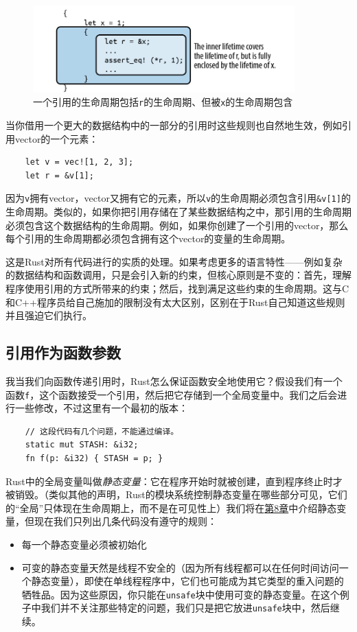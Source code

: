 \begin{figure}[htbp]
    \centering
    \includegraphics[width=0.9\textwidth]{../img/f5-6.png}
    \caption{一个引用的生命周期包括\texttt{r}的生命周期、但被\texttt{x}的生命周期包含}
    \label{f5-6}
\end{figure}

当你借用一个更大的数据结构中的一部分的引用时这些规则也自然地生效，例如引用vector的一个元素：
\begin{verbatim}
    let v = vec![1, 2, 3];
    let r = &v[1];
\end{verbatim}

因为\texttt{v}拥有vector，vector又拥有它的元素，所以\texttt{v}的生命周期必须包含引用\texttt{\&v[1]}的生命周期。类似的，如果你把引用存储在了某些数据结构之中，那引用的生命周期必须包含这个数据结构的生命周期。例如，如果你创建了一个引用的vector，那么每个引用的生命周期都必须包含拥有这个vector的变量的生命周期。

这是Rust对所有代码进行的实质的处理。如果考虑更多的语言特性——例如复杂的数据结构和函数调用，只是会引入新的约束，但核心原则是不变的：首先，理解程序使用引用的方式所带来的约束；然后，找到满足这些约束的生命周期。这与C和C++程序员给自己施加的限制没有太大区别，区别在于Rust自己知道这些规则并且强迫它们执行。

\subsection{引用作为函数参数}\label{RefAsArg}

我当我们向函数传递引用时，Rust怎么保证函数安全地使用它？假设我们有一个函数\texttt{f}，这个函数接受一个引用，然后把它存储到一个全局变量中。我们之后会进行一些修改，不过这里有一个最初的版本：
\begin{verbatim}
    // 这段代码有几个问题，不能通过编译。
    static mut STASH: &i32;
    fn f(p: &i32) { STASH = p; }
\end{verbatim}

Rust中的全局变量叫做\emph{静态变量}：它在程序开始时就被创建，直到程序终止时才被销毁。（类似其他的声明，Rust的模块系统控制静态变量在哪些部分可见，它们的“全局”只体现在生命周期上，而不是在可见性上）我们将在\hyperref[ch08]{第8章}中介绍静态变量，但现在我们只列出几条代码没有遵守的规则：
\begin{itemize}
    \item 每一个静态变量必须被初始化
    \item 可变的静态变量天然是线程不安全的（因为所有线程都可以在任何时间访问一个静态变量），即使在单线程程序中，它们也可能成为其它类型的重入问题的牺牲品。因为这些原因，你只能在\texttt{unsafe}块中使用可变的静态变量。在这个例子中我们并不关注那些特定的问题，我们只是把它放进\texttt{unsafe}块中，然后继续。
\end{itemize}

